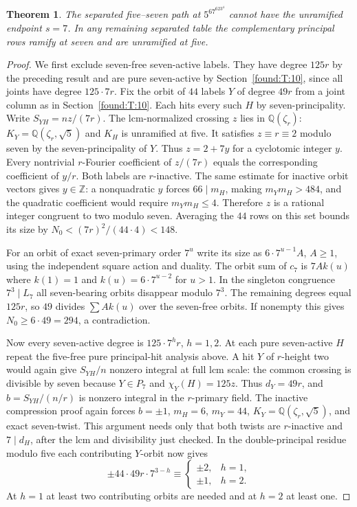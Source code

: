 \documentclass[11pt,a4paper]{article}
\numberwithin{equation}{section}
\newtheorem{theorem}{Theorem}[section]
\theoremstyle{remark}
\newcommand{\ZZ}{\mathbb Z}
\newcommand{\QQ}{\mathbb Q}
\begin{document}
\begin{theorem}\label{por:th:odd-seven-elim}
The separated five--seven path at $5^67^623^4$ cannot have the unramified endpoint $s=7$. In any remaining separated table the complementary principal rows ramify at seven and are unramified at five.
\end{theorem}
\begin{proof}
We first exclude seven-free seven-active labels. They have degree $125r$ by the preceding result and are pure seven-active by Section~\ref{found:T:10}, since all joints have degree $125\cdot7r$. Fix the orbit of $44$ labels $Y$ of degree $49r$ from a joint column as in Section~\ref{found:T:10}. Each hits every such $H$ by seven-principality. Write $S_{YH}=n z/(7r)$. The lcm-normalized crossing $z$ lies in $\QQ(\zeta_r)$: $K_Y=\QQ(\zeta_r,\sqrt5)$ and $K_H$ is unramified at five. It satisfies $z\equiv r\equiv2$ modulo seven by the seven-principality of $Y$. Thus $z=2+7y$ for a cyclotomic integer $y$. Every nontrivial $r$-Fourier coefficient of $z/(7r)$ equals the corresponding coefficient of $y/r$. Both labels are $r$-inactive. The same estimate for inactive orbit vectors gives $y\in\ZZ$: a nonquadratic $y$ forces $66\mid m_H$, making $m_Ym_H>484$, and the quadratic coefficient would require $m_Ym_H\le4$. Therefore $z$ is a rational integer congruent to two modulo seven. Averaging the $44$ rows on this set bounds its size by $N_0<(7r)^2/(44\cdot4)<148$.

For an orbit of exact seven-primary order $7^u$ write its size as $6\cdot7^{u-1}A$, $A\ge1$, using the independent square action and duality. The orbit sum of $c_7$ is $7A k(u)$ where $k(1)=1$ and $k(u)=6\cdot7^{u-2}$ for $u>1$. In the singleton congruence $7^3\mid L_7$ all seven-bearing orbits disappear modulo $7^3$. The remaining degrees equal $125r$, so $49$ divides $\sum A k(u)$ over the seven-free orbits. If nonempty this gives $N_0\ge6\cdot49=294$, a contradiction.

Now every seven-active degree is $125\cdot7^hr$, $h=1,2$. At each pure seven-active $H$ repeat the five-free pure principal-hit analysis above. A hit $Y$ of $r$-height two would again give $S_{YH}/n$ nonzero integral at full lcm scale: the common crossing is divisible by seven because $Y\in P_7$ and $\chi_Y(H)=125z$. Thus $d_Y=49r$, and $b=S_{YH}/(n/r)$ is nonzero integral in the $r$-primary field. The inactive compression proof again forces $b=\pm1$, $m_H=6$, $m_Y=44$, $K_Y=\QQ(\zeta_r,\sqrt5)$, and exact seven-twist. This argument needs only that both twists are $r$-inactive and $7\mid d_H$, after the lcm and divisibility just checked. In the double-principal residue modulo five each contributing $Y$-orbit now gives
\[
              \pm44\cdot49r\cdot7^{3-h}
                    \equiv\begin{cases}\pm2,&h=1,\\ \pm1,&h=2.\end{cases}
\]
At $h=1$ at least two contributing orbits are needed and at $h=2$ at least one.


\end{proof}
\end{document}
